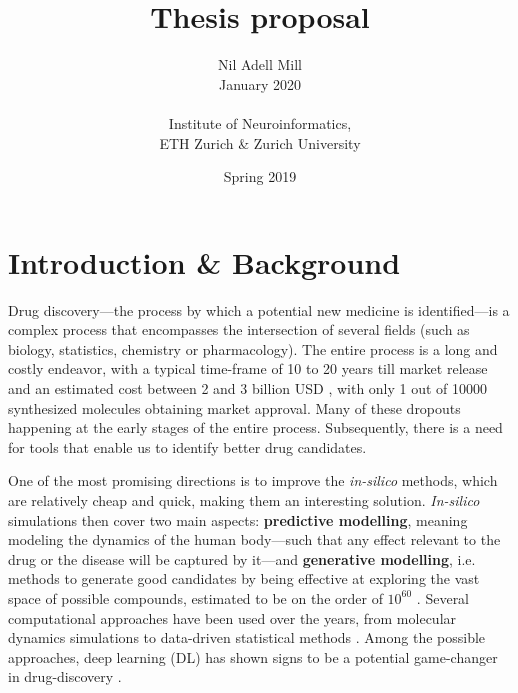 \documentclass{article}
\begin{document}
\title{\Large Thesis proposal}
\author{Nil Adell Mill \\
        January 2020 \\ \\
        Institute of Neuroinformatics, \\
        ETH Zurich \& Zurich University}
\date{Spring 2019}

\maketitle

    \section*{Introduction \& Background}

Drug discovery---the process by which a potential new medicine is identified---is a
 complex process that encompasses the intersection of several fields (such as biology,
 statistics, chemistry or pharmacology). The entire process is a long and costly
 endeavor, with a typical time-frame of 10 to 20 years till market release and an
 estimated cost between 2 and 3 billion USD \cite{Schneider2019, Scannell2012}, with
 only 1 out of 10000 synthesized molecules obtaining market approval. Many of these
 dropouts happening at the early stages of the entire process.
 Subsequently, there is a need for tools that enable us to identify better
 drug candidates.

One of the most promising directions is to improve the \emph{in-silico} methods, which
 are relatively cheap and quick, making them an interesting solution. \emph{In-silico}
 simulations then cover two main aspects: \textbf{predictive modelling}, meaning
 modeling the dynamics of the human body---such that any effect relevant to the drug or
 the disease will be captured by it---and \textbf{generative modelling}, i.e. methods to
 generate good candidates by being effective at exploring the vast space of possible
 compounds, estimated to be on the order of $10^{60}$ \cite{Reymond2012}. Several
 computational approaches have been used over the years, from molecular dynamics
 simulations to data-driven statistical methods \cite{Hung2014, Kuhn2016}. Among the
 possible approaches, deep learning (DL) has shown signs to be a potential game-changer
 in drug-discovery \cite{Dargan2019}. 
 
\end{document}
